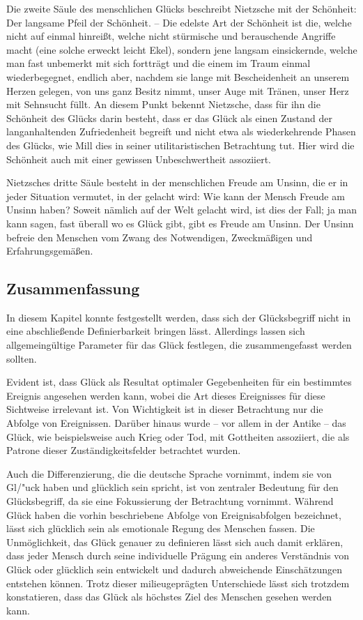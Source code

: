 Die zweite Säule des menschlichen Glücks beschreibt Nietzsche mit der Schönheit: \glqq Der langsame Pfeil der Schönheit. -- Die edelste Art der Schönheit ist die, welche nicht auf einmal hinreißt, welche nicht stürmische und berauschende Angriffe macht (eine solche erweckt leicht Ekel), sondern jene langsam einsickernde, welche man fast unbemerkt mit sich fortträgt und die einem im Traum einmal wiederbegegnet, endlich aber, nachdem sie lange mit Bescheidenheit an unserem Herzen gelegen, von uns ganz Besitz nimmt, unser Auge mit Tränen, unser Herz mit Sehnsucht füllt.\glqq{}\cite{FN06, S.131}
An diesem Punkt bekennt Nietzsche, dass für ihn die Schönheit des Glücks darin besteht, dass er das Glück als einen Zustand der langanhaltenden Zufriedenheit begreift und nicht etwa als wiederkehrende Phasen des Glücks, wie Mill dies in seiner utilitaristischen Betrachtung tut. 
Hier wird die Schönheit auch mit einer gewissen Unbeschwertheit assoziiert.

Nietzsches dritte Säule besteht in der menschlichen Freude am Unsinn, die er in jeder Situation vermutet, in der gelacht wird: \glqq Wie kann der Mensch Freude am Unsinn haben? Soweit nämlich auf der Welt gelacht wird, ist dies der Fall; ja man kann sagen, fast überall wo es Glück gibt, gibt es Freude am Unsinn.\grqq{}\cite{FN06, S.159}
Der Unsinn befreie den Menschen vom Zwang des \glqq Notwendigen, Zweckmäßigen und Erfahrungsgemäßen\grqq{}.\cite{FN06, S.159}


\subsection{Zusammenfassung}

In diesem Kapitel konnte festgestellt werden, dass sich der Glücksbegriff nicht in eine abschließende Definierbarkeit bringen lässt. 
Allerdings lassen sich allgemeingültige Parameter für das Glück festlegen, die zusammengefasst werden sollten.

Evident ist, dass Glück als Resultat optimaler Gegebenheiten für ein bestimmtes Ereignis angesehen werden kann, wobei die Art dieses Ereignisses für diese Sichtweise irrelevant ist. 
Von Wichtigkeit ist in dieser Betrachtung nur die Abfolge von Ereignissen. 
Darüber hinaus wurde -- vor allem in der Antike -- das Glück, wie beispielsweise auch Krieg oder Tod, mit Gottheiten assoziiert, die als Patrone dieser Zuständigkeitsfelder betrachtet wurden. 

Auch die Differenzierung, die die deutsche Sprache vornimmt, indem sie von \glqq Gl/"uck haben\grqq{} und \glqq glücklich sein\grqq{} spricht, ist von zentraler Bedeutung für den Glücksbegriff, da sie eine Fokussierung der Betrachtung vornimmt. 
Während \glqq Glück haben\grqq{} die vorhin beschriebene Abfolge von Ereignisabfolgen bezeichnet, lässt sich  \glqq glücklich sein\grqq{} als emotionale Regung des Menschen fassen. 
Die Unmöglichkeit, das Glück genauer zu definieren lässt sich auch damit erklären, dass jeder Mensch durch seine individuelle Prägung ein anderes Verständnis von Glück oder glücklich sein entwickelt und dadurch abweichende Einschätzungen entstehen können. 
Trotz dieser milieugeprägten Unterschiede lässt sich trotzdem konstatieren, dass das Glück als höchstes Ziel des Menschen gesehen werden kann.

